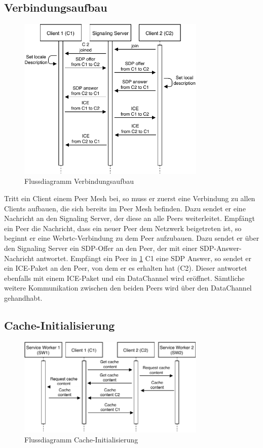 \begin{description}
\subsection{Verbindungsaufbau}
\begin{figure}[!h]
	\centering
	\includegraphics[width=0.8\textwidth]{figures/verbindungsaufbau}
	\caption[A Figure Short-Title]{Flussdiagramm Verbindungsaufbau}
	\label{fig:verbindungsaufbau}
\end{figure}


Tritt ein Client einem Peer Mesh bei, so muss er zuerst eine Verbindung zu allen Clients aufbauen, die sich bereits im Peer Mesh befinden. Dazu sendet er eine Nachricht an den Signaling Server, der diese an alle Peers weiterleitet. Empfängt ein Peer die Nachricht, dass ein neuer Peer dem Netzwerk beigetreten ist, so beginnt er eine Webrtc-Verbindung zu dem Peer aufzubauen. Dazu sendet er über den Signaling Server ein SDP-Offer an den Peer, der mit einer SDP-Answer-Nachricht antwortet. Empfängt ein Peer in \ref{fig:verbindungsaufbau} C1 eine SDP Answer, so sendet er ein ICE-Paket an den Peer, von dem er es erhalten hat (C2). Dieser antwortet ebenfalls mit einem ICE-Paket und ein DataChannel wird eröffnet. Sämtliche weitere Kommunikation zwischen den beiden Peers wird über den DataChannel gehandhabt. 

\subsection{Cache-Initialisierung}
\begin{figure}[!h]
	\centering
	\includegraphics[width=0.8\textwidth]{figures/cache_initialisierung}
	\caption[A Figure Short-Title]{Flussdiagramm Cache-Initialisierung}
	\label{fig:cache_initialisierung}
\end{figure}


\end{description}

